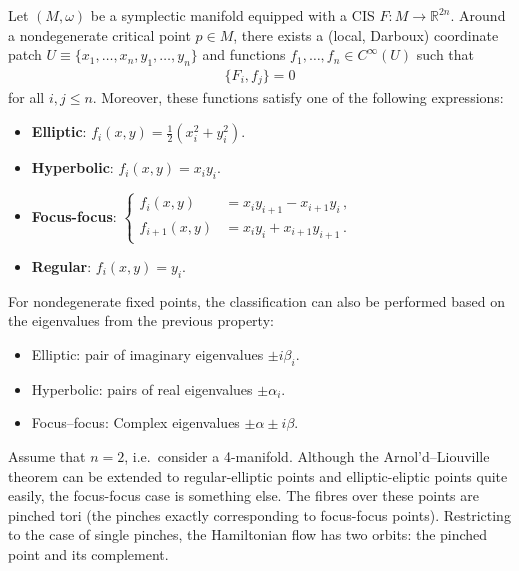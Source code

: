     \begin{property}
        Let $(M,\omega)$ be a symplectic manifold equipped with a CIS $F:M\rightarrow\mathbb{R}^{2n}$. Around a nondegenerate critical point $p\in M$, there exists a (local, Darboux) coordinate patch $U\equiv\{x_1,\ldots,x_n,y_1,\ldots,y_n\}$ and functions $f_1,\ldots,f_n\in C^\infty(U)$ such that
        \begin{gather}
            \{F_i,f_j\}=0
        \end{gather}
        for all $i,j\leq n$. Moreover, these functions satisfy one of the following expressions:
        \begin{itemize}
            \item\textbf{Elliptic}: $f_i(x,y)=\frac{1}{2}(x_i^2+y_i^2)$.
            \item\textbf{Hyperbolic}: $f_i(x,y) = x_iy_i$.
            \item\textbf{Focus-focus}: $\begin{cases}f_i(x,y)&=x_iy_{i+1}-x_{i+1}y_i\,,\\f_{i+1}(x,y)&=x_iy_i+x_{i+1}y_{i+1}\,.\end{cases}$
            \item\textbf{Regular}: $f_i(x,y)=y_i$.
        \end{itemize}
        For nondegenerate fixed points, the classification can also be performed based on the eigenvalues from the previous property:
        \begin{itemize}
            \item Elliptic: pair of imaginary eigenvalues $\pm i\beta_i$.
            \item Hyperbolic: pairs of real eigenvalues $\pm \alpha_i$.
            \item Focus--focus: Complex eigenvalues $\pm\alpha\pm i\beta$.
        \end{itemize}
    \end{property}

    \begin{remark}
        Assume that $n=2$, i.e.~consider a 4-manifold. Although the Arnol'd--Liouville theorem can be extended to regular-elliptic points and elliptic-eliptic points quite easily, the focus-focus case is something else. The fibres over these points are pinched tori (the pinches exactly corresponding to focus-focus points). Restricting to the case of single pinches, the Hamiltonian flow has two orbits: the pinched point and its complement.
    \end{remark}


